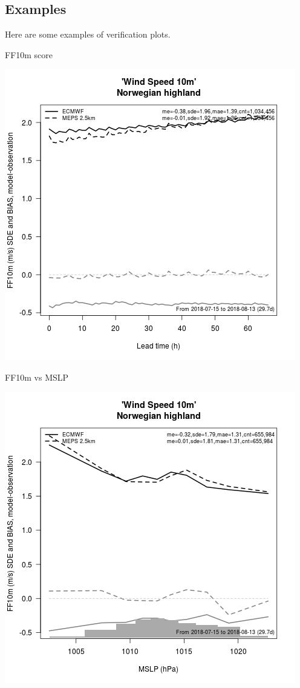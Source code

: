 \documentclass[letterpaper,10pt,twoside,twocolumn,openany]{book}
\begin{document}
{\subsection{Examples}
Here are some examples of verification plots.

\begin{paperbox}{FF10m score}
  \centerline{\includegraphics[width=0.8\columnwidth]{ff10m_score_hl.jpg}}
\end{paperbox}

\begin{paperbox}{FF10m vs MSLP}
  \centerline{\includegraphics[width=0.8\columnwidth]{ff10m_mslp_hl.jpg}}
\end{paperbox}

}
\end{document}
